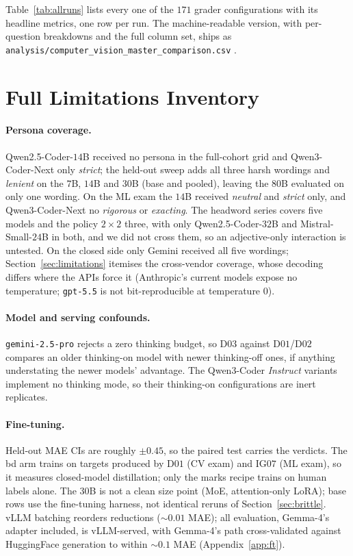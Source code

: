 Table~\ref{tab:allruns} lists every one of the $171$ grader configurations with its headline metrics, one row per run. The machine-readable version, with per-question breakdowns and the full column set, ships as \texttt{analysis/computer\_vision\_master\_comparison.csv} \artifactsin.



\section{Full Limitations Inventory}
\label{app:limitations}

\paragraph{Persona coverage.}
Qwen2.5-Coder-$14$B received no persona in the full-cohort grid and Qwen3-Coder-Next only \emph{strict}; the held-out sweep adds all three harsh wordings and \emph{lenient} on the $7$B, $14$B and $30$B (base and pooled), leaving the $80$B evaluated on only one wording. On the ML exam the $14$B received \emph{neutral} and \emph{strict} only, and Qwen3-Coder-Next no \emph{rigorous} or \emph{exacting}. The headword series covers five models and the policy $2\times2$ three, with only Qwen2.5-Coder-$32$B and Mistral-Small-$24$B in both, and we did not cross them, so an adjective-only interaction is untested. On the closed side only Gemini received all five wordings; Section~\ref{sec:limitations} itemises the cross-vendor coverage, whose decoding differs where the APIs force it (Anthropic's current models expose no temperature; \texttt{gpt-5.5} is not bit-reproducible at temperature $0$).

\paragraph{Model and serving confounds.}
\texttt{gemini-2.5-pro} rejects a zero thinking budget, so D$03$ against D$01$/D$02$ compares an older thinking-on model with newer thinking-off ones, if anything understating the newer models' advantage. The Qwen3-Coder \emph{Instruct} variants implement no thinking mode, so their thinking-on configurations are inert replicates.


\paragraph{Fine-tuning.}
Held-out MAE CIs are roughly $\pm 0.45$, so the paired test carries the verdicts. The bd arm trains on targets produced by D$01$ (CV exam) and IG$07$ (ML exam), so it measures closed-model distillation; only the marks recipe trains on human labels alone. The $30$B is not a clean size point (MoE, attention-only LoRA); base rows use the fine-tuning harness, not identical reruns of Section~\ref{sec:brittle}. vLLM batching reorders reductions ($\sim 0.01$ MAE); all evaluation, Gemma-4's adapter included, is vLLM-served, with Gemma-4's path cross-validated against HuggingFace generation to within $\sim 0.1$ MAE (Appendix~\ref{app:ft}).


